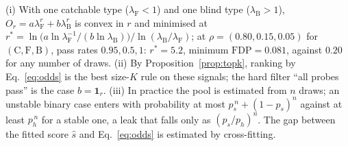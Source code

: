\begin{remark}
(i) With one catchable type ($\lambda_{\mathrm F} < 1$) and one blind type
($\lambda_{\mathrm B} > 1$), $O_r = a\lambda_{\mathrm F}^r + b\lambda_{\mathrm B}^r$ is
convex in $r$ and minimised at
$r^\ast = \ln\!\big(a \ln \lambda_{\mathrm F}^{-1} / (b \ln \lambda_{\mathrm B})\big)
/ \ln(\lambda_{\mathrm B}/\lambda_{\mathrm F})$; at $\rho = (0.80, 0.15, 0.05)$ for
$(\mathrm C, \mathrm F, \mathrm B)$, pass rates $0.95, 0.5, 1$: $r^\ast = 5.2$, minimum
$\mathrm{FDP} = 0.081$, against $0.20$ for any number of draws.
(ii) By Proposition~\ref{prop:topk}, ranking by Eq.~\eqref{eq:odds} is the best size-$K$
rule on these signals; the hard filter ``all probes pass'' is the case $b = \mathbf{1}_r$.
(iii) In practice the pool is estimated from $n$ draws; an unstable binary case enters
with probability at most $p_s^{\,n} + (1 - p_s)^n$ against at least $p_h^{\,n}$ for a
stable one, a leak that falls only as $(p_s/p_h)^n$. The gap between the fitted score
$\hat s$ and Eq.~\eqref{eq:odds} is estimated by cross-fitting.
\end{remark}
